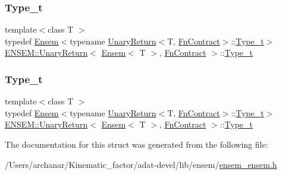 \subsubsection{\texorpdfstring{Type\_t}{Type\_t}\hspace{0.1cm}{\footnotesize\ttfamily [2/3]}}
{\footnotesize\ttfamily template$<$class T $>$ \\
typedef \mbox{\hyperlink{classENSEM_1_1Ensem}{Ensem}}$<$typename \mbox{\hyperlink{structENSEM_1_1UnaryReturn}{Unary\+Return}}$<$T, \mbox{\hyperlink{structENSEM_1_1FnContract}{Fn\+Contract}}$>$\+::\mbox{\hyperlink{structENSEM_1_1UnaryReturn_3_01Ensem_3_01T_01_4_00_01FnContract_01_4_a3be6c264185868ff0356a15a3b802b83}{Type\+\_\+t}}$>$ \mbox{\hyperlink{structENSEM_1_1UnaryReturn}{E\+N\+S\+E\+M\+::\+Unary\+Return}}$<$ \mbox{\hyperlink{classENSEM_1_1Ensem}{Ensem}}$<$ T $>$, \mbox{\hyperlink{structENSEM_1_1FnContract}{Fn\+Contract}} $>$\+::\mbox{\hyperlink{structENSEM_1_1UnaryReturn_3_01Ensem_3_01T_01_4_00_01FnContract_01_4_a3be6c264185868ff0356a15a3b802b83}{Type\+\_\+t}}}

\mbox{\label{structENSEM_1_1UnaryReturn_3_01Ensem_3_01T_01_4_00_01FnContract_01_4_a3be6c264185868ff0356a15a3b802b83}} 
\subsubsection{\texorpdfstring{Type\_t}{Type\_t}\hspace{0.1cm}{\footnotesize\ttfamily [3/3]}}
{\footnotesize\ttfamily template$<$class T $>$ \\
typedef \mbox{\hyperlink{classENSEM_1_1Ensem}{Ensem}}$<$typename \mbox{\hyperlink{structENSEM_1_1UnaryReturn}{Unary\+Return}}$<$T, \mbox{\hyperlink{structENSEM_1_1FnContract}{Fn\+Contract}}$>$\+::\mbox{\hyperlink{structENSEM_1_1UnaryReturn_3_01Ensem_3_01T_01_4_00_01FnContract_01_4_a3be6c264185868ff0356a15a3b802b83}{Type\+\_\+t}}$>$ \mbox{\hyperlink{structENSEM_1_1UnaryReturn}{E\+N\+S\+E\+M\+::\+Unary\+Return}}$<$ \mbox{\hyperlink{classENSEM_1_1Ensem}{Ensem}}$<$ T $>$, \mbox{\hyperlink{structENSEM_1_1FnContract}{Fn\+Contract}} $>$\+::\mbox{\hyperlink{structENSEM_1_1UnaryReturn_3_01Ensem_3_01T_01_4_00_01FnContract_01_4_a3be6c264185868ff0356a15a3b802b83}{Type\+\_\+t}}}



The documentation for this struct was generated from the following file\+:\begin{DoxyCompactItemize}
\item 
/\+Users/archanar/\+Kinematic\+\_\+factor/adat-\/devel/lib/ensem/\mbox{\hyperlink{adat-devel_2lib_2ensem_2ensem__ensem_8h}{ensem\+\_\+ensem.\+h}}\end{DoxyCompactItemize}
